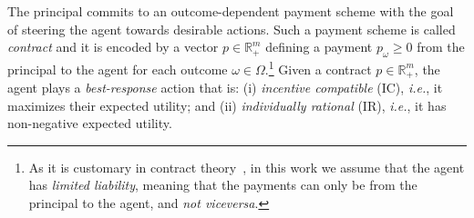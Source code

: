 The principal commits to an outcome-dependent payment scheme with the goal of steering the agent towards desirable actions.
%
Such a payment scheme is called \emph{contract} and it is encoded by a vector $p \in \mathbb{R}^{m}_{+}$ defining a payment $p_\omega \geq 0$ from the principal to the agent for each outcome $\omega \in \Omega$.\footnote{As it is customary in contract theory~\citep{carroll2015robustness}, in this work we assume that the agent has \emph{limited liability}, meaning that the payments can only be from the principal to the agent, and \emph{not viceversa}.}
%
%
%
%
%
%
%
Given a contract $p \in \mathbb{R}^{m}_{+}$, the agent plays a \emph{best-response} action that is: {(i)} \emph{incentive compatible} (IC), \emph{i.e.}, it maximizes their expected utility; and {(ii)} \emph{individually rational} (IR), \emph{i.e.}, it has non-negative expected utility.
%
%
